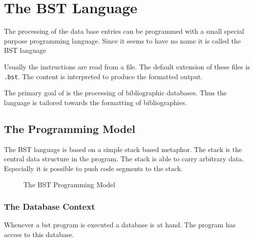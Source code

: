 
\chapter{The BST Language}%

%
The processing of the data base entries can be programmed with a small
special purpose programming language. Since it seems to have no name
it is called the BST language

Usually the instructions are read from a file. The default extension
of these files is \texttt{.bst}. The content is interpreted to produce
the formatted output.

The primary goal of \BibTeX{} is the processing of
bibliographic databases. Thus the language is tailored towards the
formatting of bibliographies.


\def\cmdIndex#1{\index{#1@\texttt{#1}}}%
\def\fctIndex#1{\index{#1@\texttt{#1}}%
  \index{function!#1@\texttt{#1}}}%
\def\varIndex#1{\index{#1@\texttt{#1}}%
  \index{variable!#1@\texttt{#1}}}%

\section{The Programming Model}

The BST language is based on a simple stack based metaphor. The stack
is the central data structure in the program. The stack is able to
carry arbitrary data. Especially it is possible to push code segments
to the stack.

\begin{figure}[tb]
  \centering
  
  \caption{The BST Programming Model}
  \label{fig:bst-model}
\end{figure}


\subsection{The Database Context}

Whenever a bst program is executed a database is at hand. The program
has access to this database.

